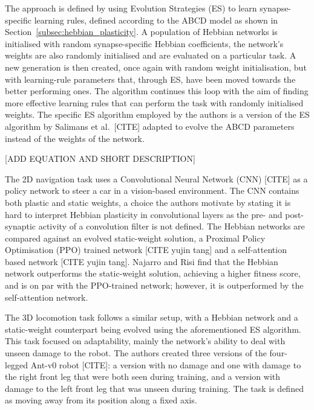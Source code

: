 \documentclass{article} %
\begin{document}
The approach is defined by using Evolution Strategies (ES) to learn synapse-specific learning rules, defined according to the ABCD model as shown in Section~\ref{subsec:hebbian_plasticity}. A population of Hebbian networks is initialised with random synapse-specific Hebbian coefficients, the network's weights are also randomly initialised and are evaluated on a particular task. A new generation is then created, once again with random weight initialisation, but with learning-rule parameters that, through ES, have been moved towards the better performing ones. The algorithm continues this loop with the aim of finding more effective learning rules that can perform the task with randomly initialised weights. The specific ES algorithm employed by the authors is a version of the ES algorithm by Salimans et al.\ [CITE] adapted to evolve the ABCD parameters instead of the weights of the network.

[ADD EQUATION AND SHORT DESCRIPTION]

The 2D navigation task uses a Convolutional Neural Network (CNN) [CITE] as a policy network to steer a car in a vision-based environment. The CNN contains both plastic and static weights, a choice the authors motivate by stating it is hard to interpret Hebbian plasticity in convolutional layers as the pre- and post-synaptic activity of a convolution filter is not defined. The Hebbian networks are compared against an evolved static-weight solution, a Proximal Policy Optimisation (PPO) trained network [CITE yujin tang] and a self-attention based network [CITE yujin tang]. Najarro and Risi find that the Hebbian network outperforms the static-weight solution, achieving a higher fitness score, and is on par with the PPO-trained network; however, it is outperformed by the self-attention network.

The 3D locomotion task follows a similar setup, with a Hebbian network and a static-weight counterpart being evolved using the aforementioned ES algorithm. This task focused on adaptability, mainly the network's ability to deal with unseen damage to the robot. The authors created three versions of the four-legged Ant-v0 robot [CITE]: a version with no damage and one with damage to the right front leg that were both seen during training, and a version with damage to the left front leg that was unseen during training. The task is defined as moving away from its position along a fixed axis.
\end{document}
